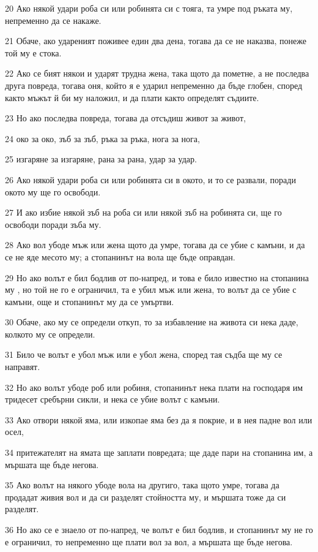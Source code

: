 \par 20 Ако някой удари роба си или робинята си с тояга, та умре под ръката му, непременно да се накаже.
\par 21 Обаче, ако удареният поживее един два дена, тогава да се не наказва, понеже той му е стока.
\par 22 Ако се бият някои и ударят трудна жена, така щото да пометне, а не последва друга повреда, тогава оня, който я е ударил непременно да бъде глобен, според както мъжът й би му наложил, и да плати както определят съдиите.
\par 23 Но ако последва повреда, тогава да отсъдиш живот за живот,
\par 24 око за око, зъб за зъб, ръка за ръка, нога за нога,
\par 25 изгаряне за изгаряне, рана за рана, удар за удар.
\par 26 Ако някой удари роба си или робинята си в окото, и то се развали, поради окото му ще го освободи.
\par 27 И ако избие някой зъб на роба си или някой зъб на робинята си, ще го освободи поради зъба му.
\par 28 Ако вол убоде мъж или жена щото да умре, тогава да се убие с камъни, и да се не яде месото му; а стопанинът на вола ще бъде оправдан.
\par 29 Но ако волът е бил бодлив от по-напред, и това е било известно на стопанина му , но той не го е ограничил, та е убил мъж или жена, то волът да се убие с камъни, още и стопанинът му да се умъртви.
\par 30 Обаче, ако му се определи откуп, то за избавление на живота си нека даде, колкото му се определи.
\par 31 Било че волът е убол мъж или е убол жена, според тая съдба ще му се направят.
\par 32 Но ако волът убоде роб или робиня, стопанинът нека плати на господаря им тридесет сребърни сикли, и нека се убие волът с камъни.
\par 33 Ако отвори някой яма, или изкопае яма без да я покрие, и в нея падне вол или осел,
\par 34 притежателят на ямата ще заплати повредата; ще даде пари на стопанина им, а мършата ще бъде негова.
\par 35 Ако волът на някого убоде вола на другиго, така щото умре, тогава да продадат живия вол и да си разделят стойността му, и мършата тоже да си разделят.
\par 36 Но ако се е знаело от по-напред, че волът е бил бодлив, и стопанинът му не го е ограничил, то непременно ще плати вол за вол, а мършата ще бъде негова.

